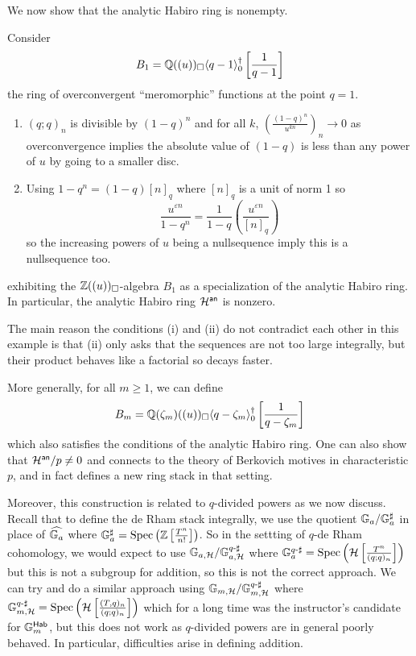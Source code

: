 We now show that the analytic Habiro ring is nonempty. 
\begin{example}
    Consider 
    $$B_{1}=\mathbb{Q}((u))_{\square}\langle q-1\rangle_{0}^{\dagger}\left[\frac{1}{q-1}\right]$$
    the ring of overconvergent ``meromorphic'' functions at the point $q=1$. 
    \begin{enumerate}[label=(\roman*)]
        \item $(q;q)_{n}$ is divisible by $(1-q)^{n}$ and for all $k$, $\left(\frac{(1-q)^{n}}{u^{kn}}\right)_{n}\to0$ as overconvergence implies the absolute value of $(1-q)$ is less than any power of $u$ by going to a smaller disc. 
        \item Using $1-q^{n}=(1-q)[n]_{q}$ where $[n]_{q}$ is a unit of norm 1 so 
        $$\frac{u^{\varepsilon n}}{1-q^{n}}=\frac{1}{1-q}\left(\frac{u^{\varepsilon n}}{[n]_{q}}\right)$$
        so the increasing powers of $u$ being a nullsequence imply this is a nullsequence too. 
    \end{enumerate}
    exhibiting the $\mathbb{Z}((u))_{\square}$-algebra $B_{1}$ as a specialization of the analytic Habiro ring. In particular, the analytic Habiro ring $\mathcal{H}^{\mathsf{an}}$ is nonzero. 
\end{example}
\begin{remark}
    The main reason the conditions (i) and (ii) do not contradict each other in this example is that (ii) only asks that the sequences are not too large integrally, but their product behaves like a factorial so decays faster. 
\end{remark}
More generally, for all $m\geq 1$, we can define 
$$B_{m}=\mathbb{Q}(\zeta_{m})((u))_{\square}\langle q-\zeta_{m}\rangle_{0}^{\dagger}\left[\frac{1}{q-\zeta_{m}}\right]$$
which also satisfies the conditions of the analytic Habiro ring. One can also show that $\mathcal{H}^{\mathsf{an}}/p\neq0$ and connects to the theory of Berkovich motives in characteristic $p$, and in fact defines a new ring stack in that setting.  

Moreover, this construction is related to $q$-divided powers as we now discuss. Recall that to define the de Rham stack integrally, we use the quotient $\mathbb{G}_{a}/\mathbb{G}_{a}^{\sharp}$ in place of $\widehat{\mathbb{G}_{a}}$ where $\mathbb{G}_{a}^{\sharp}=\operatorname{Spec}\left(\mathbb{Z}\left[\frac{T^{n}}{n!}\right]\right)$. So in the settting of $q$-de Rham cohomology, we would expect to use $\mathbb{G}_{a,\mathcal{H}}/\mathbb{G}_{a,\mathcal{H}}^{q\text{-}\sharp}$ where $\mathbb{G}_{a}^{q\text{-}\sharp}=\operatorname{Spec}\left(\mathcal{H}\left[\frac{T^{n}}{(q;q)_{n}}\right]\right)$ but this is not a subgroup for addition, so this is not the correct approach. We can try and do a similar approach using $\mathbb{G}_{m,\mathcal{H}}/\mathbb{G}_{m,\mathcal{H}}^{q\text{-}\sharp}$ where $\mathbb{G}_{m,\mathcal{H}}^{q\text{-}\sharp}=\operatorname{Spec}\left(\mathcal{H}\left[\frac{(T,q)_{n}}{(q;q)_{n}}\right]\right)$ which for a long time was the instructor's candidate for $\mathbb{G}_{m}^{\mathsf{Hab}}$, but this does not work as $q$-divided powers are in general poorly behaved. In particular, difficulties arise in defining addition. 